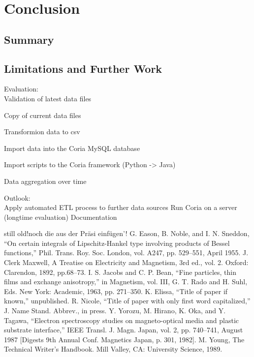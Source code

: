 \documentclass[conference]{IEEEtran}
\begin{document}
\section{Conclusion} %
\subsection{Summary}
\subsection{Limitations and Further Work}
Evaluation: \\
Validation of latest data files

Copy of current data files

Transformion data to csv

Import data into the Coria MySQL database

Import scripts to the Coria framework (Python -> Java)

Data aggregation over time

Outlook:\\
Apply automated ETL process to further data sources
Run Coria on a server (longtime evaluation)
Documentation


\begin{thebibliography}{00}


still old!noch die aus der Präsi einfügen'! G. Eason, B. Noble, and I. N. Sneddon, ``On certain integrals of Lipschitz-Hankel type involving products of Bessel functions,'' Phil. Trans. Roy. Soc. London, vol. A247, pp. 529--551, April 1955.
 J. Clerk Maxwell, A Treatise on Electricity and Magnetism, 3rd ed., vol. 2. Oxford: Clarendon, 1892, pp.68--73.
 I. S. Jacobs and C. P. Bean, ``Fine particles, thin films and exchange anisotropy,'' in Magnetism, vol. III, G. T. Rado and H. Suhl, Eds. New York: Academic, 1963, pp. 271--350.
 K. Elissa, ``Title of paper if known,'' unpublished.
 R. Nicole, ``Title of paper with only first word capitalized,'' J. Name Stand. Abbrev., in press.
 Y. Yorozu, M. Hirano, K. Oka, and Y. Tagawa, ``Electron spectroscopy studies on magneto-optical media and plastic substrate interface,'' IEEE Transl. J. Magn. Japan, vol. 2, pp. 740--741, August 1987 [Digests 9th Annual Conf. Magnetics Japan, p. 301, 1982].
 M. Young, The Technical Writer's Handbook. Mill Valley, CA: University Science, 1989.
\end{thebibliography}
\end{document}
